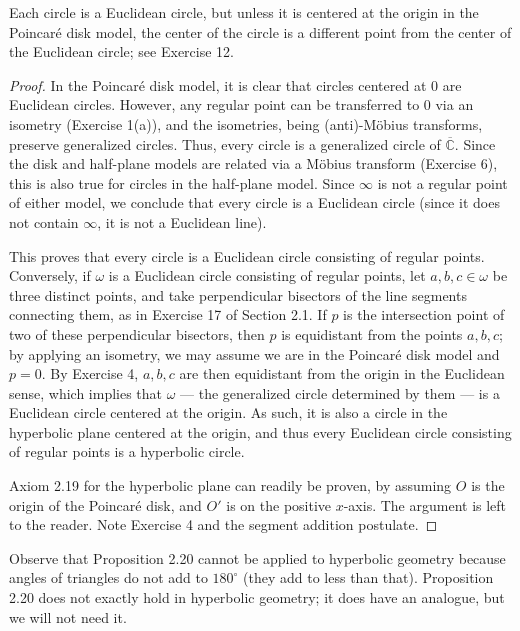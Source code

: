 \documentclass[leqno]{book}
\begin{document}
\noindent Each circle is a Euclidean circle, but unless it is centered at the origin in the Poincar\'e disk model, the center of the circle is a different point from the center of the Euclidean circle; see Exercise 12.
\begin{proof}
In the Poincar\'e disk model, it is clear that circles centered at $0$ are Euclidean circles.  However, any regular point can be transferred to $0$ via an isometry (Exercise 1(a)), and the isometries, being (anti)-M\"obius transforms, preserve generalized circles.  Thus, every circle is a generalized circle of $\overline{\mathbb C}$.  Since the disk and half-plane models are related via a M\"obius transform (Exercise 6), this is also true for circles in the half-plane model.  Since $\infty$ is not a regular point of either model, we conclude that every circle is a Euclidean circle (since it does not contain $\infty$, it is not a Euclidean line).

This proves that every circle is a Euclidean circle consisting of regular points.  Conversely, if $\omega$ is a Euclidean circle consisting of regular points, let $a,b,c\in\omega$ be three distinct points, and take perpendicular bisectors of the line segments connecting them, as in Exercise 17 of Section 2.1.  If $p$ is the intersection point of two of these perpendicular bisectors, then $p$ is equidistant from the points $a,b,c$; by applying an isometry, we may assume we are in the Poincar\'e disk model and $p=0$.  By Exercise 4, $a,b,c$ are then equidistant from the origin in the Euclidean sense, which implies that $\omega$ \---- the generalized circle determined by them \---- is a Euclidean circle centered at the origin.  As such, it is also a circle in the hyperbolic plane centered at the origin, and thus every Euclidean circle consisting of regular points is a hyperbolic circle.

Axiom 2.19 for the hyperbolic plane can readily be proven, by assuming $O$ is the origin of the Poincar\'e disk, and $O'$ is on the positive $x$-axis.  The argument is left to the reader.  Note Exercise 4 and the segment addition postulate.
\end{proof}

\noindent Observe that Proposition 2.20 cannot be applied to hyperbolic geometry because angles of triangles do not add to $180^\circ$ (they add to less than that).  Proposition 2.20 does not exactly hold in hyperbolic geometry; it does have an analogue, but we will not need it.\\ %
\end{document}
